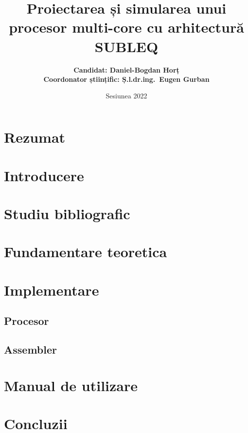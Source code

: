 \documentclass[12pt, a4paper]{uptacthesis}
\title{Proiectarea și simularea unui procesor multi-core cu arhitectură SUBLEQ}
\author{\large\bfseries
    Candidat: Daniel-Bogdan Horț\\[1ex]
    Coordonator științific: Ș.l.dr.ing.~Eugen Gurban\\[2cm]
}
\date{\large Sesiunea 2022}
\begin{document}
\maketitle

\chapter*{Rezumat}


\tableofcontents

\chapter{Introducere}


\chapter{Studiu bibliografic}


\chapter{Fundamentare teoretica}


\chapter{Implementare}
\section{Procesor}

\section{Assembler}


\chapter{Manual de utilizare}


\chapter{Concluzii}





\cleardoublepage
{}
\listoffigures

\printnoidxglossary[type=\acronymtype, title=Listă de abrevieri]

\appendix
\cleardoublepage

\end{document}
